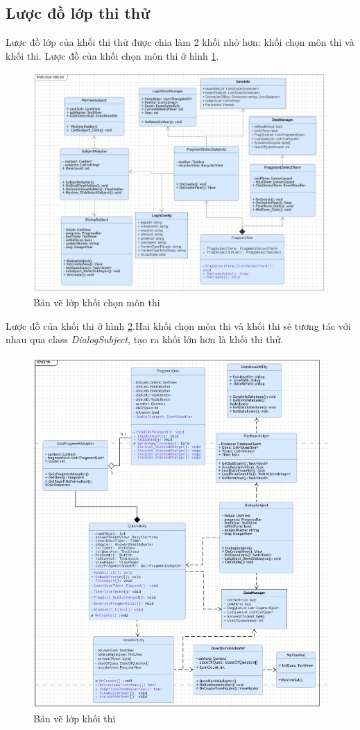 \documentclass[a4paper]{article}
\begin{document}
\subsection{Lược đồ lớp thi thử}
Lược đồ lớp của khối thi thử được chia làm 2 khối nhỏ hơn: khối chọn môn thi và khối thi. Lược đồ của khối chọn môn thi ở hình \ref{fig:uml_choose}.
\begin{figure}[H]
    \centering
    \includegraphics[scale=.4]{uml_choose.png}
    \caption{Bản vẽ lớp khối chọn môn thi}
    \label{fig:uml_choose}
\end{figure}
Lược đồ của khối thi ở hình \ref{fig:uml_test}.Hai khối chọn môn thi và khối thi sẽ tương tác với nhau qua class \textit{DialogSubject}, tạo ra khối lớn hơn là khối thi thử.
\begin{figure}[H]
    \centering
    \includegraphics[scale = .5]{uml_test.png}
    \caption{Bản vẽ lớp khối thi}
    \label{fig:uml_test}
\end{figure}
\end{document}
